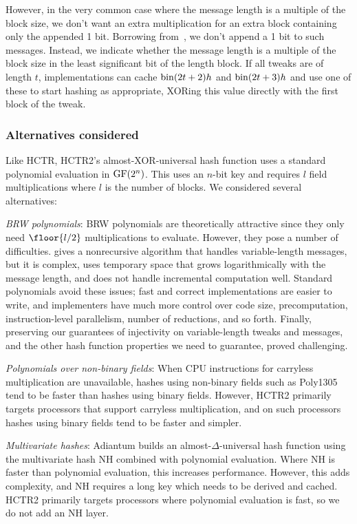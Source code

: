 \documentclass[hctr2.tex]{subfiles}
\begin{document}
However, in the very common case where 
the message length is a multiple of the block size,
we don't want an extra multiplication
for an extra block containing only the appended 1 bit.
Borrowing from~\cite{xcbc},
we don't append a 1 bit to such messages.
Instead, we indicate whether
the message length is a multiple of the block size
in the least significant bit of the length block.
If all tweaks are of length \(t\), implementations can cache
\(\operatorname{bin}(2t + 2)h\) and \(\operatorname{bin}(2t + 3)h\)
and use one of these to start hashing as appropriate,
XORing this value directly with the first block of the tweak.

\subsubsection{Alternatives considered}

Like HCTR, HCTR2's almost-XOR-universal hash function uses a standard polynomial
evaluation in $\operatorname{GF}(2^n)$. This uses an $n$-bit key and requires $l$ field
multiplications where $l$ is the number of blocks.
We considered several alternatives:

\emph{BRW polynomials}: BRW polynomials\cite{pema}\cite{heh2} are theoretically
attractive since they only need \(\floor{l/2}\) multiplications
to evaluate. However, they pose a number of difficulties. \cite{brweval} gives a
nonrecursive algorithm that handles variable-length messages, but it is complex,
uses temporary space that grows logarithmically with the message length,
and does not handle incremental computation well.
Standard polynomials avoid these issues;
fast and correct implementations are easier to write,
and implementers have much more control over
code size, precomputation, instruction-level
parallelism, number of reductions, and so forth.
Finally, preserving our guarantees of injectivity on variable-length
tweaks and messages, and the other hash function properties we need
to guarantee, proved challenging.

\emph{Polynomials over non-binary fields}: When CPU instructions for carryless
multiplication are unavailable, hashes using non-binary fields such as
Poly1305\cite{poly1305} tend to be faster than hashes using binary fields.
However, HCTR2 primarily targets
processors that support carryless multiplication, 
and on such processors hashes
using binary fields tend to be faster and simpler.

\emph{Multivariate hashes}: Adiantum\cite{adiantum} builds an
almost-$\Delta$-universal hash function using the multivariate hash
NH\cite{umac1} combined with polynomial evaluation. Where NH is faster than
polynomial evaluation, this increases performance. However, this adds
complexity, and NH requires a long key which needs to be derived and cached. 
HCTR2 primarily targets processors where polynomial evaluation is fast, so
we do not add an NH layer.
\end{document}
